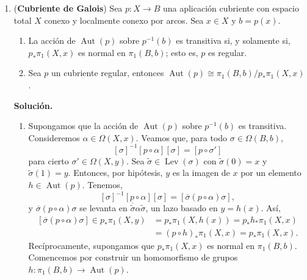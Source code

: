 \documentclass[11pt,a4paper]{article}
\theoremstyle{plain}
\theoremstyle{definition}
\theoremstyle{remark}
\DeclareMathOperator{\Aut}{Aut}
\DeclareMathOperator{\Lev}{Lev}
\begin{document}
\begin{enumerate}[label=\arabic*.,leftmargin=*]
Sea $\beta=p\circ\alpha\in\Omega(B,b)$. El elemento $[\beta]\in\pi_1(B,b)$
define un automorfismo $\beta_*:\pi_1(B,b)\to\pi_1(B,b)$,
$[\gamma]\mapsto[\beta\gamma\overline\beta]$. Se tiene el diagrama
conmutativo siguiente:
\[
\begin{tikzcd}
\pi_1(X,x_0) \arrow[r,"\alpha_*"] \arrow[d,swap,hook,"p_*"] & \pi_1(X,x_1) \arrow[d,hook,"p_*"] \\
\pi_1(B,b) \arrow[r,swap,"\beta_*"] & \pi_1(B,b)
\end{tikzcd}
\]
En efecto, sea $\delta:I\to X\in\Omega(X,x_0)$. Entonces,
\[
(p_*\circ\alpha_*)([\delta])=p_*([\alpha\delta\overline\alpha])
=[p\circ\alpha][p\circ\delta][p\circ\overline\alpha]
=[\beta]p_*([\delta])[\beta]^{-1}
=(\beta_*\circ p_*)([\delta]).
\]
Ya que $\alpha_*$ es un isomorfismo,
$\beta_*(p_*\pi_1(X,x_0))=p_*\pi_1(X,x_1)$.

Recíprocamente, escojamos un elemento $[\alpha']\in\pi_1(B,b)$. Sea
$\overline\alpha':I\to B\in\Omega(B,b)$ un lazo que representa la clase
$\alpha'$ y sea $\beta':I\to X\in\Lev(\overline\alpha')$ tal que
$\beta'(0)=x_0$. Pongamos $x_1'=\beta'(1)$. Los argumentos precedentes
muestran que
\[
p_*\pi_1(X,x_1')=[\alpha']\,p_*\pi_1(X,x_0)\,[\alpha']^{-1}.
\]

\item (\textbf{Cubriente de Galois}) Sea $p:X\to B$ una aplicación cubriente
con espacio total $X$ conexo y localmente conexo por arcos. Sea $x\in X$ y
$b=p(x)$.
\begin{enumerate}[label=\alph*)]
\item La acción de $\Aut(p)$ sobre $p^{-1}(b)$ es transitiva si, y
solamente si, $p_*\pi_1(X,x)$ es normal en $\pi_1(B,b)$; esto es, $p$ es
regular.
\item Sea $p$ un cubriente regular, entonces
$\Aut(p)\cong\pi_1(B,b)/p_*\pi_1(X,x)$.
\end{enumerate}

\noindent\textbf{Solución.}
\begin{enumerate}[label=\alph*)]
\item Supongamos que la acción de $\Aut(p)$ sobre $p^{-1}(b)$ es
transitiva. Consideremos $\alpha\in\Omega(X,x)$. Veamos que, para todo
$\sigma\in\Omega(B,b)$,
\[
[\sigma]^{-1}[p\circ\alpha][\sigma]=[p\circ\sigma']
\]
para cierto $\sigma'\in\Omega(X,y)$. Sea $\tilde\sigma\in\Lev(\sigma)$ con
$\tilde\sigma(0)=x$ y $\tilde\sigma(1)=y$. Entonces, por hipótesis, $y$ es
la imagen de $x$ por un elemento $h\in\Aut(p)$. Tenemos,
\[
[\sigma]^{-1}[p\circ\alpha][\sigma]=[\overline\sigma(p\circ\alpha)\sigma],
\]
y $\overline\sigma(p\circ\alpha)\sigma$ se levanta en
$\overline{\tilde\sigma}\alpha\tilde\sigma$, un lazo basado en $y=h(x)$.
Así,
\[
\begin{aligned}
[\overline\sigma(p\circ\alpha)\sigma]\in p_*\pi_1(X,y)&=p_*\pi_1(X,h(x))=p_*h_*\pi_1(X,x)\\
&=(p\circ h)_*\pi_1(X,x)=p_*\pi_1(X,x).
\end{aligned}
\]
Recíprocamente, supongamos que $p_*\pi_1(X,x)$ es normal en $\pi_1(B,b)$.
Comencemos por construir un homomorfismo de grupos
$h:\pi_1(B,b)\to\Aut(p)$.


\end{enumerate}
\end{enumerate}
\end{document}
